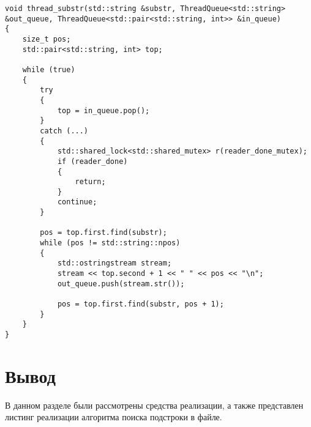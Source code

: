 \begin{lstlisting}[label=lst:parse,caption=Функция работы потока, обрабатывающего строки]
void thread_substr(std::string &substr, ThreadQueue<std::string> &out_queue, ThreadQueue<std::pair<std::string, int>> &in_queue)
{
	size_t pos;
	std::pair<std::string, int> top;

	while (true)
	{
		try
		{
			top = in_queue.pop();
		}
		catch (...)
		{
			std::shared_lock<std::shared_mutex> r(reader_done_mutex);
			if (reader_done)
			{
				return;
			}
			continue;
		}

		pos = top.first.find(substr);
		while (pos != std::string::npos)
		{
			std::ostringstream stream;
			stream << top.second + 1 << " " << pos << "\n";
			out_queue.push(stream.str());

			pos = top.first.find(substr, pos + 1);
		}
	}
}
\end{lstlisting}

\section*{Вывод}

В данном разделе были рассмотрены средства реализации, а также представлен листинг реализации алгоритма поиска подстроки в файле.

